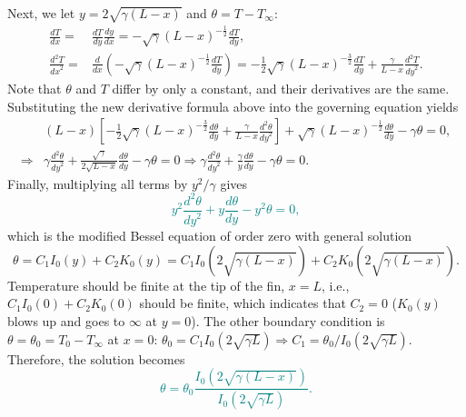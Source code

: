 \documentclass[12pt]{article}
\begin{document}
\begin{ex}
\begin{solution}
  Next, we let $y=2\sqrt{\gamma(L-x)}$ and $\theta=T-T_{\infty}$:
  \begin{align*}
    \frac{dT}{dx}=&\frac{dT}{dy}\frac{dy}{dx}=-\sqrt{\gamma}(L-x)^{-\tfrac{1}{2}}\frac{dT}{dy},\\
    \frac{d^2T}{{dx}^2}=&\frac{d}{dx}\left(-\sqrt{\gamma}(L-x)^{-\tfrac{1}{2}}\frac{dT}{dy}\right)=-\tfrac{1}{2}\sqrt{\gamma}(L-x)^{-\tfrac{3}{2}}\frac{dT}{dy}+\frac{\gamma}{L-x}\frac{d^2T}{{dy}^2}.
  \end{align*}
  Note that $\theta$ and $T$ differ by only a constant, and their derivatives are the same. Substituting the new derivative formula above into the governing equation yields
  \begin{align*}
    &(L-x)\left[-\tfrac{1}{2}\sqrt{\gamma}(L-x)^{-\tfrac{3}{2}}\frac{d\theta}{dy}+\frac{\gamma}{L-x}\frac{d^2\theta}{{dy}^2}\right]+\sqrt{\gamma}(L-x)^{-\tfrac{1}{2}}\frac{d\theta}{dy}-\gamma\theta=0,\\
    \Rightarrow&\gamma\frac{d^2\theta}{{dy}^2}+\frac{\sqrt{\gamma}}{2\sqrt{L-x}}\frac{d\theta}{dy}-\gamma\theta=0\Rightarrow\gamma\frac{d^2\theta}{{dy}^2}+\frac{\gamma}{y}\frac{d\theta}{dy}-\gamma\theta=0. 
  \end{align*}
  Finally, multiplying all terms by $y^2/\gamma$ gives\textcolor{teal}{$$y^2\frac{d^2\theta}{{dy}^2}+y\frac{d\theta}{dy}-y^2\theta=0,$$}%
  which is the modified Bessel equation of order zero with general solution
  $$\theta=C_1I_0(y)+C_2K_0(y)=C_1I_0(2\sqrt{\gamma(L-x)})+C_2K_0(2\sqrt{\gamma(L-x)}).$$
  Temperature should be finite at the tip of the fin, $x=L$, i.e., $C_1I_0(0)+C_2K_0(0)$ should be finite, which indicates that $C_2=0$ ($K_0(y)$ blows up and goes to $\infty$ at $y=0$). The other boundary condition is $\theta=\theta_0=T_0-T_{\infty}$ at $x=0$: $\theta_0=C_1I_0(2\sqrt{\gamma L})\Rightarrow C_1=\theta_0/I_0(2\sqrt{\gamma L})$. Therefore, the solution becomes\textcolor{teal}{$$\theta=\theta_0\frac{I_0(2\sqrt{\gamma(L-x)})}{I_0(2\sqrt{\gamma L})}.$$}%
\end{solution}
\end{ex}
\end{document}
